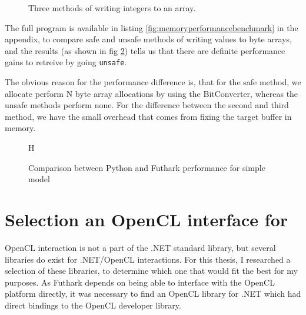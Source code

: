 \begin{description}
\begin{figure}[H]
\begin{verbatim}
\end{verbatim}
  \caption{Three methods of writing integers to an array.}
  \label{fig:threemethods}
\end{figure}


The full program is available in listing \ref{fig:memoryperformancebenchmark} in the
appendix, to compare safe and unsafe methods of writing values to byte arrays, and the
results (as shown in fig \ref{fig:shortperformancegraph}) tells us that there
are definite performance gains to retreive by going \texttt{unsafe}.

The obvious reason for the performance difference is, that for the safe
method, we allocate perform N byte array allocations by using the BitConverter,
whereas the unsafe methods perform none.
For the difference between the second and third method, we have the small
overhead that comes from fixing the target buffer in memory.
\begin{figure}{H}
    \caption{Comparison between Python and Futhark performance for simple model}
    \label{fig:shortperformancegraph}
\end{figure}

\clearpage

\section{Selection an OpenCL interface for \csharp{}}
OpenCL interaction is not a part of the .NET standard library, but several
libraries do exist for .NET/OpenCL interactions. For this thesis, I researched a
selection of these libraries, to determine which one that would fit the best for
my purposes.
As Futhark depends on being able to interface with the OpenCL platform directly,
it was necessary to find an OpenCL library for .NET which had direct bindings to
the OpenCL developer library.


\end{description}
